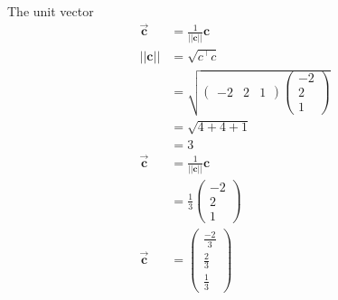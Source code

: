 \documentclass[journal,10pt,twocolumn]{article}
\newcommand{\myvec}[1]{\ensuremath{\begin{pmatrix}#1\end{pmatrix}}}
\let\vec\mathbf
\let\vec\mathbf
\begin{document}
\begin{enumerate}
\begin{align}
\end{align}
The unit vector 
\begin{align}
\overrightarrow{\vec{c}}&=\frac{1}{||\vec{c}||}\vec{c}\\
{||\vec{c}||}&=\sqrt{c^\top c}\\
&=\sqrt{\myvec{-2& 2& 1}\myvec{-2\\2\\1}}\\
&=\sqrt{4+4+1}\\
&=3\\
\overrightarrow{\vec{c}}&=\frac{1}{||\vec{c}||}\vec{c}\\
&=\frac{1}{3}\myvec{-2\\2\\1}\\
\overrightarrow{\vec{c}}&=\myvec{\frac{-2}{3}\\[3pt]\frac{2}{3}\\[3pt]\frac{1}{3}}
\end{align}
\end{enumerate} 
\end{document}
